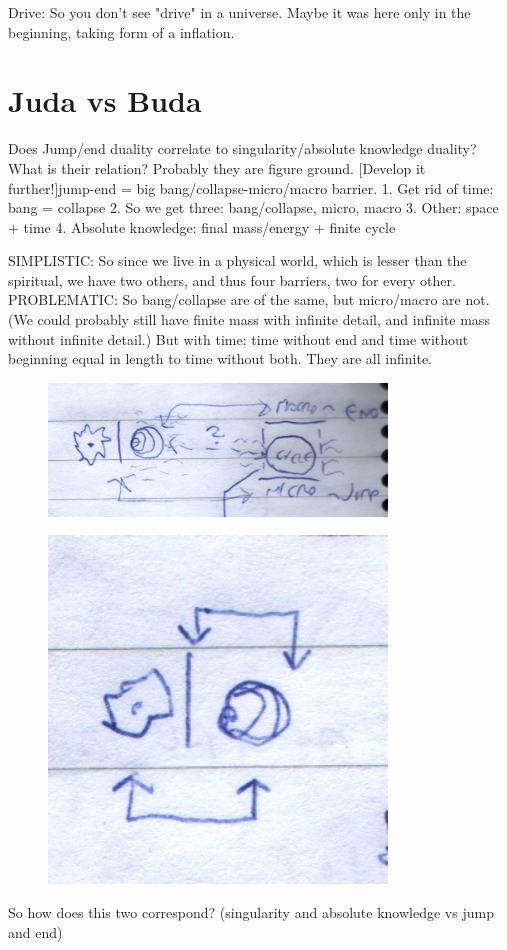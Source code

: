 \documentclass{book}
\begin{document}
Drive: So you don't see "drive" in a universe. Maybe it was here only in the beginning, taking form of a inflation.


\chapter{Juda vs Buda}

Does Jump/end duality correlate to singularity/absolute knowledge duality? What is their relation? Probably they are figure ground. [Develop it further!]jump-end = big bang/collapse-micro/macro barrier.
1. Get rid of time: bang = collapse
2. So we get three: bang/collapse, micro, macro
3. Other: space + time
4. Absolute knowledge: final mass/energy + finite cycle

SIMPLISTIC:
So since we live in a physical world, which is lesser than the spiritual, we have two others, and thus four barriers, two for every other.
PROBLEMATIC:
So bang/collapse are of the same, but micro/macro are not. (We could probably still have finite mass with infinite detail, and infinite mass without infinite detail.) But with time: time without end and time without beginning equal in length to time without both. They are all infinite.
\begin{figure}[ht!]
\centering
\includegraphics[width=90mm]{scan07.jpg}
\label{overflow}
\end{figure}
\begin{figure}[ht!]
\centering
\includegraphics[width=90mm]{scan08.jpg}
\label{overflow}
\end{figure}
So how does this two correspond? (singularity and absolute knowledge vs jump and end)
\end{document}
